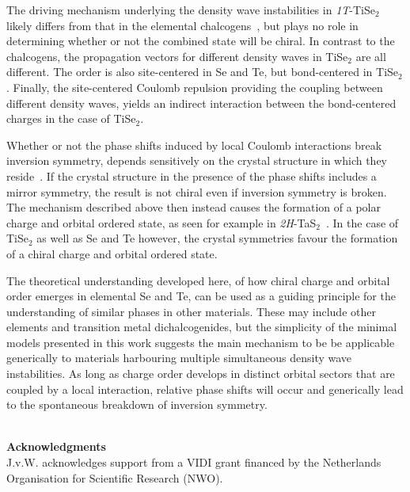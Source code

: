\documentclass[aps,prl,twocolumn,superscriptaddress,groupedaddress]{revtex4}
\begin{document}
The driving mechanism underlying the density wave instabilities in \emph{1T}-TiSe$_2$ likely differs from that in the elemental chalcogens~\cite{wezel10_TiSe2_CDW,abbamonte}, but plays no role in determining whether or not the combined state will be chiral. In contrast to the chalcogens, the propagation vectors for different density waves in TiSe$_2$ are all different. The order is also site-centered in Se and Te, but bond-centered in TiSe$_2$. Finally, the site-centered Coulomb repulsion providing the coupling between different density waves, yields an indirect interaction between the bond-centered charges in the case of TiSe$_2$. 

Whether or not the phase shifts induced by local Coulomb interactions break inversion symmetry, depends sensitively on the crystal structure in which they reside~\cite{prerequisites,TaS2vanwezel}. If the crystal structure in the presence of the phase shifts includes a mirror symmetry, the result is not chiral even if inversion symmetry is broken. The mechanism described above then instead causes the formation of a polar charge and orbital ordered state, as seen for example in \emph{2H}-TaS$_2$~\cite{TaS2spain,TaS2vanwezel}.  In the case of TiSe$_2$ as well as Se and Te however, the crystal symmetries favour the formation of a chiral charge and orbital ordered state.

The theoretical understanding developed here, of how chiral charge and orbital order emerges in elemental Se and Te, can be used as a guiding principle for the understanding of similar phases in other materials. These may include other elements and transition metal dichalcogenides, but the simplicity of the minimal models presented in this work suggests the main mechanism to be  be applicable generically to materials harbouring multiple simultaneous density wave instabilities. As long as charge order develops in distinct orbital sectors that are coupled by a local interaction, relative phase shifts will occur and generically lead to the spontaneous breakdown of inversion symmetry.

~\\ \indent
{\bf Acknowledgments} \\
J.v.W. acknowledges support from a VIDI grant financed by the Netherlands Organisation for Scientific Research (NWO).

% 
\end{document}
